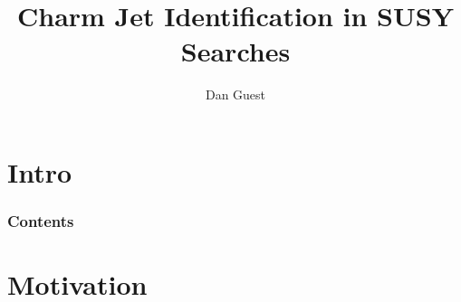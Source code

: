 \documentclass[usenames,dvipsnames]{beamer}
\title[Charmed SUSY]{Charm Jet Identification in SUSY Searches}
\author[dhg3]{Dan Guest}
\institute[Yale]{Yale University}
\begin{document}
\section*{Intro}

\maketitle
\begin{frame}
  \frametitle{Contents}
  \tableofcontents
\end{frame}


\section{Motivation}
\end{document}
